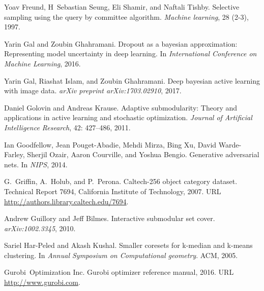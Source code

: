 \documentclass{article} %
\begin{document}
\begin{thebibliography}{40}
Yoav Freund, H~Sebastian Seung, Eli Shamir, and Naftali Tishby.
\newblock Selective sampling using the query by committee algorithm.
\newblock \emph{Machine learning}, 28 (2-3), 1997.

Yarin Gal and Zoubin Ghahramani.
\newblock Dropout as a bayesian approximation: Representing model uncertainty
  in deep learning.
\newblock In \emph{International Conference on Machine Learning}, 2016.

Yarin Gal, Riashat Islam, and Zoubin Ghahramani.
\newblock Deep bayesian active learning with image data.
\newblock \emph{arXiv preprint arXiv:1703.02910}, 2017.

Daniel Golovin and Andreas Krause.
\newblock Adaptive submodularity: Theory and applications in active learning
  and stochastic optimization.
\newblock \emph{Journal of Artificial Intelligence Research}, 42:
  427--486, 2011.

Ian Goodfellow, Jean Pouget-Abadie, Mehdi Mirza, Bing Xu, David Warde-Farley,
  Sherjil Ozair, Aaron Courville, and Yoshua Bengio.
\newblock Generative adversarial nets.
\newblock In \emph{NIPS}, 2014.

G.~Griffin, A.~Holub, and P.~Perona.
\newblock Caltech-256 object category dataset.
\newblock Technical Report 7694, California Institute of Technology, 2007.
\newblock URL \url{http://authors.library.caltech.edu/7694}.

Andrew Guillory and Jeff Bilmes.
\newblock Interactive submodular set cover.
\newblock \emph{arXiv:1002.3345}, 2010.

Sariel Har-Peled and Akash Kushal.
\newblock Smaller coresets for k-median and k-means clustering.
\newblock In \emph{Annual Symposium on Computational geometry}. ACM, 2005.

Gurobi~Optimization Inc.
\newblock Gurobi optimizer reference manual, 2016.
\newblock URL \url{http://www.gurobi.com}.


\end{thebibliography}
\end{document}
